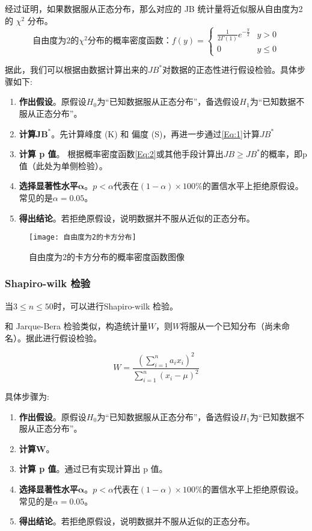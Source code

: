 \documentclass[withoutpreface]{cumcmthesis}
\begin{document}
经过证明，如果数据服从正态分布，那么对应的 JB 统计量将近似服从自由度为2的 $\chi^2$ 分布。
\begin{equation}
    \mbox{自由度为2的$\chi^2$分布的概率密度函数：} f(y) = \begin{cases}
        \frac{1}{2\Gamma(1)} e^{-\frac{y}{2}} & y>0    \\
        0                                     & y\le 0
    \end{cases}
    \label{Eq:2}
\end{equation}

据此，我们可以根据由数据计算出来的$JB^*$对数据的正态性进行假设检验。具体步骤如下:

\begin{enumerate}
    \item \textbf{作出假设}。原假设$H_0$为“已知数据服从正态分布”，备选假设$H_1$为“已知数据不服从正态分布”。
    \item \textbf{计算}$\mathbf{JB^*}$。先计算峰度 (K) 和 偏度 (S)，再进一步通过\cref{Eq:1}计算$JB^*$
    \item \textbf{计算 p 值}。 根据概率密度函数\cref{Eq:2}或其他手段计算出$JB\ge JB^*$的概率，即p值（此处为单侧检验）。
    \item \textbf{选择显著性水平}$\mathbf{\alpha}$。$p<\alpha$代表在$(1-\alpha)\times 100\%$的置信水平上拒绝原假设。常见的是$\alpha=0.05$。
    \item \textbf{得出结论}。若拒绝原假设，说明数据并不服从近似的正态分布。
\end{enumerate}

\begin{figure}[H]
    \centering
    \texttt{[image: 自由度为2的卡方分布]}
    \caption{自由度为2的卡方分布的概率密度函数图像}\label{Fig:3}
\end{figure}

\subsubsection{Shapiro-wilk 检验}

当$3\le n \le 50$时，可以进行Shapiro-wilk 检验。

和 Jarque-Bera 检验类似，构造统计量$W$，则$W$将服从一个已知分布（尚未命名）。据此进行假设检验。

\begin{equation}
    W = \frac{(\sum\limits_{i=1}^{n} a_ix_i)^2}{\sum\limits_{i=1}^{n} (x_i-\mu)^2}
\end{equation}

具体步骤为:
\begin{enumerate}
    \item \textbf{作出假设}。原假设$H_0$为“已知数据服从正态分布”，备选假设$H_1$为“已知数据不服从正态分布”。
    \item \textbf{计算}$\mathbf{W}$。
    \item \textbf{计算 p 值}。通过已有实现计算出 p 值。
    \item \textbf{选择显著性水平}$\mathbf{\alpha}$。$p<\alpha$代表在$(1-\alpha)\times 100\%$的置信水平上拒绝原假设。常见的是$\alpha=0.05$。
    \item \textbf{得出结论}。若拒绝原假设，说明数据并不服从近似的正态分布。
\end{enumerate}
\end{document}
